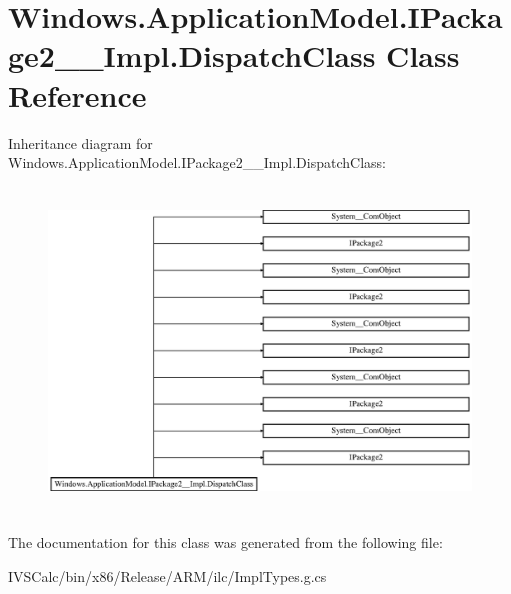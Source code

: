 \hypertarget{class_windows_1_1_application_model_1_1_i_package2_____impl_1_1_dispatch_class}{}\section{Windows.\+Application\+Model.\+I\+Package2\+\_\+\+\_\+\+Impl.\+Dispatch\+Class Class Reference}
\label{class_windows_1_1_application_model_1_1_i_package2_____impl_1_1_dispatch_class}
Inheritance diagram for Windows.\+Application\+Model.\+I\+Package2\+\_\+\+\_\+\+Impl.\+Dispatch\+Class\+:\begin{figure}[H]
\begin{center}
\leavevmode
\includegraphics[height=8.676057cm]{class_windows_1_1_application_model_1_1_i_package2_____impl_1_1_dispatch_class}
\end{center}
\end{figure}


The documentation for this class was generated from the following file\+:\begin{DoxyCompactItemize}
\item 
I\+V\+S\+Calc/bin/x86/\+Release/\+A\+R\+M/ilc/Impl\+Types.\+g.\+cs\end{DoxyCompactItemize}
